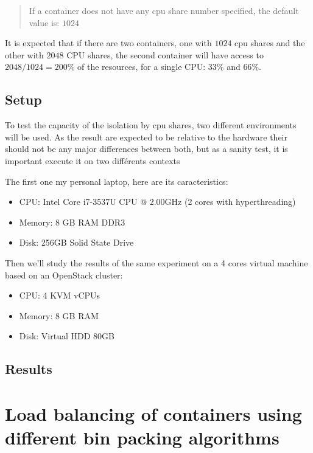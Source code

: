 \begin{quote}
If a container does not have any cpu share number specified, the default value
is: $1024$
\end{quote}

It is expected that if there are two containers, one with $1024$ cpu shares and
the other with $2048$ CPU shares, the second container will have access to
$2048/1024 = 200\%$ of the resources, for a single CPU: $33\%$ and $66\%$.

\subsection{Setup}

To test the capacity of the isolation by cpu shares, two different environments
will be used. As the result are expected to be relative to the hardware their should
not be any major differences between both, but as a sanity test, it is important
execute it on two différents contexts

The first one my personal laptop, here are its caracteristics:

\begin{itemize}
	\item{CPU: Intel\textregistered \hspace{1pt} Core\texttrademark
	\hspace{1pt} i7-3537U CPU @ 2.00GHz (2 cores with hyperthreading)}
	\item{Memory: 8 GB RAM DDR3}
	\item{Disk: 256GB Solid State Drive}
\end{itemize}

Then we'll study the results of the same experiment on a 4 cores virtual machine
based on an OpenStack cluster:

\begin{itemize}
	\item{CPU: 4 KVM vCPUs}
	\item{Memory: 8 GB RAM}
	\item{Disk: Virtual HDD 80GB}
\end{itemize}




\subsection{Results}

\section{Load balancing of containers using different bin packing algorithms}
